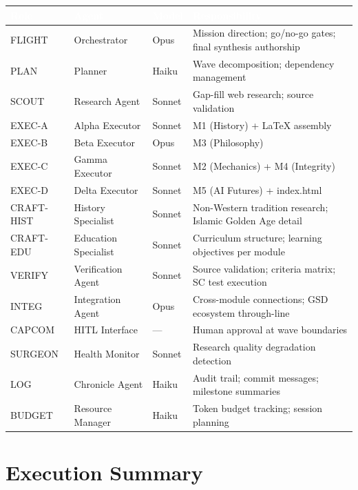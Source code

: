 \documentclass[11pt,letterpaper]{article}
\newcommand{\tableheader}[1]{\textbf{\sffamily\textcolor{white}{#1}}}
\begin{document}
\begin{center}
\begin{tabularx}{\textwidth}{L{2.5cm}L{2.5cm}C{2cm}X}
\toprule
{}
\tableheader{Role} & \tableheader{Agent} & \tableheader{Model} & \tableheader{Responsibility} \\
\midrule
FLIGHT & Orchestrator & Opus & Mission direction; go/no-go gates; final synthesis authorship \\
PLAN & Planner & Haiku & Wave decomposition; dependency management \\
SCOUT & Research Agent & Sonnet & Gap-fill web research; source validation \\
EXEC-A & Alpha Executor & Sonnet & M1 (History) + LaTeX assembly \\
EXEC-B & Beta Executor & Opus & M3 (Philosophy) \\
EXEC-C & Gamma Executor & Sonnet & M2 (Mechanics) + M4 (Integrity) \\
EXEC-D & Delta Executor & Sonnet & M5 (AI Futures) + index.html \\
CRAFT-HIST & History Specialist & Sonnet & Non-Western tradition research; Islamic Golden Age detail \\
CRAFT-EDU & Education Specialist & Sonnet & Curriculum structure; learning objectives per module \\
VERIFY & Verification Agent & Sonnet & Source validation; criteria matrix; SC test execution \\
INTEG & Integration Agent & Opus & Cross-module connections; GSD ecosystem through-line \\
CAPCOM & HITL Interface & --- & Human approval at wave boundaries \\
SURGEON & Health Monitor & Sonnet & Research quality degradation detection \\
LOG & Chronicle Agent & Haiku & Audit trail; commit messages; milestone summaries \\
BUDGET & Resource Manager & Haiku & Token budget tracking; session planning \\
\bottomrule
\end{tabularx}
\end{center}

\section{Execution Summary}
\end{document}

